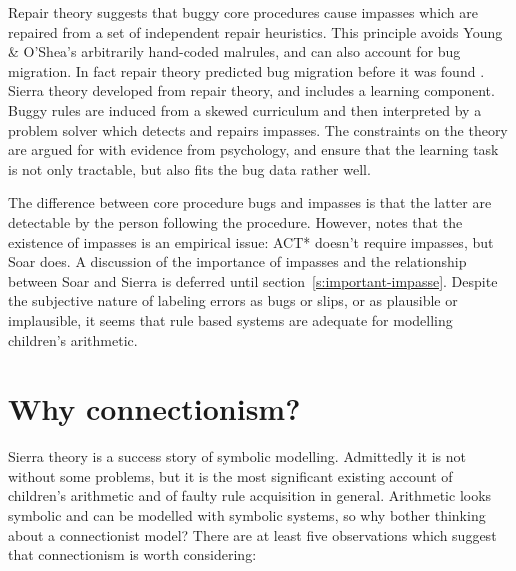 Repair theory \cite{repair} suggests that buggy core procedures cause
impasses which are repaired from a set of independent repair heuristics.
This principle avoids Young \& O'Shea's arbitrarily hand-coded malrules,
and can also account for bug migration.  In fact repair theory predicted
bug migration before it was found \cite{vanlfeli,vanlbugs}. Sierra theory
\cite{mindbugs} developed from repair theory, and includes a learning
component.  Buggy rules are induced from a skewed curriculum and then
interpreted by a problem solver which detects and repairs impasses.  The
constraints on the theory are argued for with evidence from psychology, and
ensure that the learning task is not only tractable, but also fits the bug
data rather well.

The difference between core procedure bugs and impasses is that the latter
are detectable by the person following the procedure.  However,
 notes that the existence of impasses is an empirical issue:
ACT* \cite{andearch} doesn't require impasses, but Soar \cite{soar} does.
A discussion of the importance of impasses and the relationship between
Soar and Sierra is deferred until section~\ref{s:important-impasse}.
Despite the subjective nature of labeling errors as bugs or slips, or as
plausible or implausible, it seems that rule based systems are
adequate for modelling children's arithmetic.



\section{Why connectionism?}\label{s:whypdp}


Sierra theory is a success story of symbolic modelling.  Admittedly it is
not without some problems, but it is the most significant existing account
of children's arithmetic and of faulty rule acquisition in general.
Arithmetic looks symbolic and can be modelled with symbolic systems, so why
bother thinking about a connectionist model?  There are at least five
observations which suggest that connectionism is worth considering:

